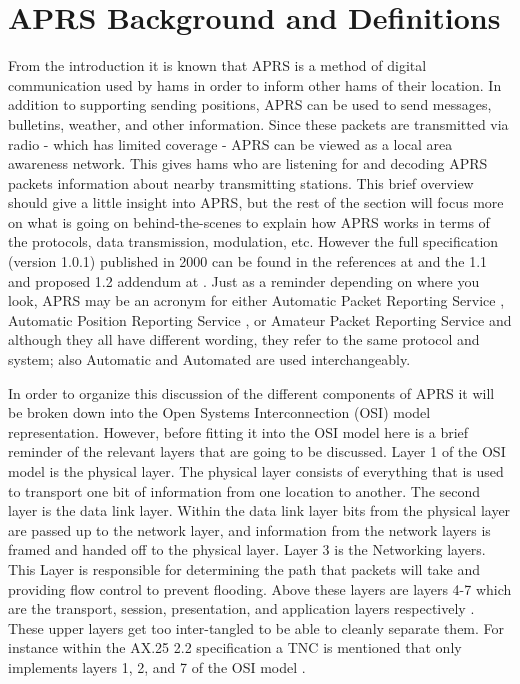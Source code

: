 \chapter{APRS Background and Definitions}
From the introduction it is known that APRS is a method of digital communication used by hams in order to inform other hams of their location. In addition to supporting sending positions, APRS can be used to send messages, bulletins, weather, and other information. Since these packets are transmitted via radio  - which has limited coverage - APRS can be viewed as a local area awareness network. This gives hams who are listening for and decoding APRS packets information about nearby transmitting stations. This brief overview should give a little insight into APRS, but the rest of the section will focus more on what is going on behind-the-scenes to explain how APRS works in terms of the protocols, data transmission, modulation, etc. However the full specification (version 1.0.1) published in 2000 can be found in the references at \cite{Group2000} and the 1.1 and proposed 1.2 addendum at \cite{Bruninga2004,Bruninga2013}. Just as a reminder depending on where you look, APRS may be an acronym for either Automatic Packet Reporting Service \cite{Bruninga}, Automatic Position Reporting Service \cite{Smith2012}, or Amateur Packet Reporting Service \cite{Holder2012} and although they all have different wording, they refer to the same protocol and system; also Automatic and Automated are used interchangeably.

In order to organize this discussion of the different components of APRS it will be broken down into the Open Systems Interconnection (OSI) model representation. However, before fitting it into the OSI model here is a brief reminder of the relevant layers that are going to be discussed. Layer 1 of the OSI model is the physical layer. The physical layer consists of everything that is used to transport one bit of information from one location to another. The second layer is the data link layer. Within the data link layer bits from the physical layer are passed up to the network layer, and information from the network layers is framed and handed off to the physical layer. Layer 3 is the Networking layers. This Layer is responsible for determining the path that packets will take and providing flow control to prevent flooding. Above these layers are layers 4-7 which are the transport, session, presentation, and application layers respectively \cite{Sosinsky2009}. These upper layers get too inter-tangled to be able to cleanly separate them. For instance within the AX.25 2.2 specification a TNC is mentioned that only implements layers 1, 2, and 7 of the OSI model \cite{Beech1998}.

